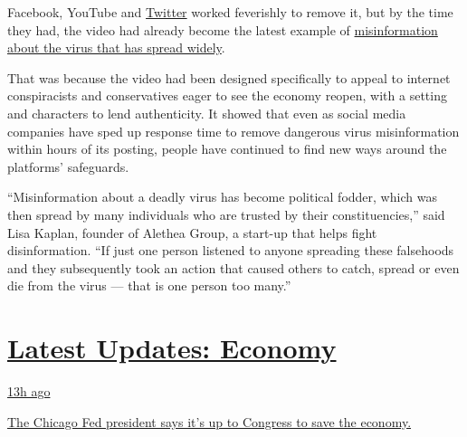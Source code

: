Facebook, YouTube and
\href{https://www.nytimes3xbfgragh.onion/2020/08/03/technology/ftc-twitter-privacy-violations.html}{Twitter}
worked feverishly to remove it, but by the time they had, the video had
already become the latest example of
\href{https://www.nytimes3xbfgragh.onion/2020/05/20/technology/plandemic-movie-youtube-facebook-coronavirus.html}{misinformation
about the virus that has spread widely}.

That was because the video had been designed specifically to appeal to
internet conspiracists and conservatives eager to see the economy
reopen, with a setting and characters to lend authenticity. It showed
that even as social media companies have sped up response time to remove
dangerous virus misinformation within hours of its posting, people have
continued to find new ways around the platforms' safeguards.

``Misinformation about a deadly virus has become political fodder, which
was then spread by many individuals who are trusted by their
constituencies,'' said Lisa Kaplan, founder of Alethea Group, a start-up
that helps fight disinformation. ``If just one person listened to anyone
spreading these falsehoods and they subsequently took an action that
caused others to catch, spread or even die from the virus --- that is
one person too many.''

\hypertarget{latest-updates-economy}{%
\section{\texorpdfstring{\href{https://www.nytimes3xbfgragh.onion/live/2020/08/03/business/stock-market-today-coronavirus?action=click\&pgtype=Article\&state=default\&region=MAIN_CONTENT_1\&context=storylines_live_updates}{Latest
Updates:
Economy}}{Latest Updates: Economy}}\label{latest-updates-economy}}

\href{https://www.nytimes3xbfgragh.onion/live/2020/08/03/business/stock-market-today-coronavirus?action=click\&pgtype=Article\&state=default\&region=MAIN_CONTENT_1\&context=storylines_live_updates\#the-chicago-fed-president-says-its-up-to-congress-to-save-the-economy}{13h
ago}

\href{https://www.nytimes3xbfgragh.onion/live/2020/08/03/business/stock-market-today-coronavirus?action=click\&pgtype=Article\&state=default\&region=MAIN_CONTENT_1\&context=storylines_live_updates\#the-chicago-fed-president-says-its-up-to-congress-to-save-the-economy}{The
Chicago Fed president says it's up to Congress to save the economy.}

